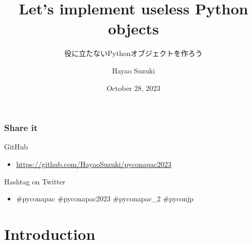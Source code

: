 \documentclass[aspectratio=169,dvipdfmx,12pt,notheorems]{beamer}
\title{Let's implement useless Python objects}
\subtitle{役に立たないPythonオブジェクトを作ろう}
\author[Hayao]{Hayao Suzuki}
\institute[PyCon APAC 2023]{PyCon APAC 2023}
\date{October 28, 2023}
\theoremstyle{definition}
\begin{document}
\begin{frame}[plain]\frametitle{}
\titlepage %
\end{frame}

\begin{frame}\frametitle{Share it}

\begin{block}{GitHub}
\begin{itemize}
\item \url{https://github.com/HayaoSuzuki/pyconapac2023}
\end{itemize}
\end{block}

\begin{block}{Hashtag on Twitter}
\begin{itemize}
\item \#pyconapac \#pyconapac2023 \#pyconapac\_2 \#pyconjp
\end{itemize}
\end{block}

\end{frame}

\section{Introduction}
\end{document}
